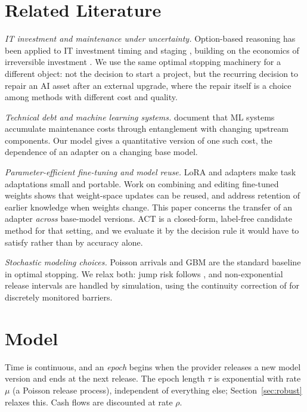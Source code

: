 \documentclass[acmsmall,review]{acmart}
\begin{document}
\section{Related Literature}\label{sec:lit}

\emph{IT investment and maintenance under uncertainty.} Option-based reasoning has been applied to IT investment
timing and staging \citep{benaroch1999case,benaroch2002managing}, building on the economics of irreversible
investment \citep{mcdonald1986value,dixit1994investment}. We use the same optimal stopping machinery for a
different object: not the decision to start a project, but the recurring decision to repair an AI asset after an
external upgrade, where the repair itself is a choice among methods with different cost and quality.

\emph{Technical debt and machine learning systems.} \citet{sculley2015hidden} document that ML systems accumulate
maintenance costs through entanglement with changing upstream components. Our model gives a quantitative version of
one such cost, the dependence of an adapter on a changing base model.

\emph{Parameter-efficient fine-tuning and model reuse.} LoRA \citep{hu2022lora} and adapters \citep{houlsby2019parameter}
make task adaptations small and portable. Work on combining and editing fine-tuned weights
\citep{ilharco2023editing} shows that weight-space updates can be reused, and \citet{kirkpatrick2017overcoming}
address retention of earlier knowledge when weights change. This paper concerns the transfer of an adapter \emph{across} base-model versions. ACT is a closed-form, label-free candidate method for that setting, and we evaluate it by the decision rule it would have to satisfy rather than by accuracy alone.

\emph{Stochastic modeling choices.} Poisson arrivals and GBM are the standard baseline in optimal stopping. We relax
both: jump risk follows \citet{merton1976option}, and non-exponential release intervals are handled by simulation,
using the continuity correction of \citet{broadie1997continuity} for discretely monitored barriers.

\section{Model}\label{sec:model}

Time is continuous, and an \emph{epoch} begins when the provider releases a new model version and ends at the next
release. The epoch length $\tau$ is exponential with rate $\mu$ (a Poisson release process), independent of
everything else; Section~\ref{sec:robust} relaxes this. Cash flows are discounted at rate $\rho$.
\end{document}
